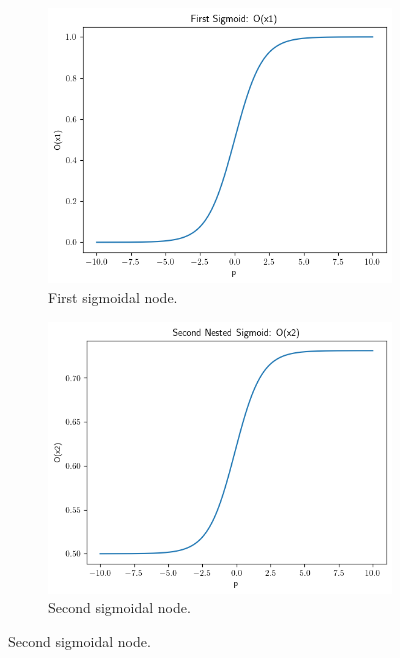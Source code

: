 \begin{figure}[htbp]
  \centering
  \begin{subfigure}[b]{0.32\textwidth}
    \centering
    \includegraphics[width=\textwidth]{img/sigmoid_illus_x1.png}
    \caption{First sigmoidal node.}
    \label{fig:a_sigmoid_1}
  \end{subfigure}\hfill
  \begin{subfigure}[b]{0.32\textwidth}
    \centering
    \includegraphics[width=\textwidth]{img/sigmoid_illus_x2.png}
    \caption{Second sigmoidal node.}

\end{subfigure}
\end{figure}
